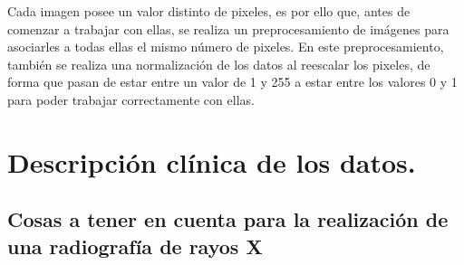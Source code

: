 Cada imagen posee un valor distinto de pixeles, es por ello que, antes de comenzar a trabajar con ellas, se realiza un preprocesamiento de imágenes para asociarles a todas ellas el mismo número de pixeles. En este preprocesamiento, también se realiza una normalización de los datos al reescalar los pixeles, de forma que pasan de estar entre un valor de 1 y 255 a estar entre los valores 0 y 1 para poder trabajar correctamente con ellas.

    
\section{Descripción clínica de los datos.}

\subsection{Cosas a tener en cuenta para la realización de una radiografía de rayos X}

